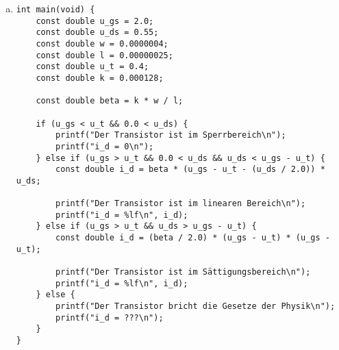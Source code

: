 \documentclass{standalone}
\begin{document}
\begin{enumerate}[a)]
\begin{verbatim}
            printf("Der Transistor ist im linearen Bereich\n");
            printf("u_ds = %lf\n", u_ds_lin);
        }
    }
}
    \end{verbatim}

\item
    \begin{verbatim}
int main(void) {
    const double u_gs = 2.0;
    const double u_ds = 0.55;
    const double w = 0.0000004;
    const double l = 0.00000025;
    const double u_t = 0.4;
    const double k = 0.000128;

    const double beta = k * w / l;

    if (u_gs < u_t && 0.0 < u_ds) {
        printf("Der Transistor ist im Sperrbereich\n");
        printf("i_d = 0\n");
    } else if (u_gs > u_t && 0.0 < u_ds && u_ds < u_gs - u_t) {
        const double i_d = beta * (u_gs - u_t - (u_ds / 2.0)) * u_ds;

        printf("Der Transistor ist im linearen Bereich\n");
        printf("i_d = %lf\n", i_d);
    } else if (u_gs > u_t && u_ds > u_gs - u_t) {
        const double i_d = (beta / 2.0) * (u_gs - u_t) * (u_gs - u_t);

        printf("Der Transistor ist im Sättigungsbereich\n");
        printf("i_d = %lf\n", i_d);
    } else {
        printf("Der Transistor bricht die Gesetze der Physik\n");
        printf("i_d = ???\n");
    }
}
    \end{verbatim}

\end{enumerate}
\end{document}
